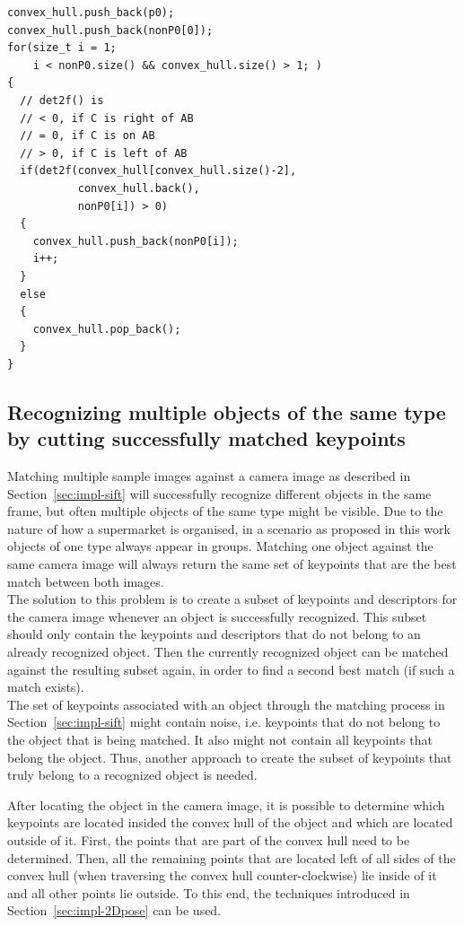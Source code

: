 \begin{lstlisting}[caption=This C++ code example demonstrates how the Graham Scan algorithm determines the convex hull of an already sorted set of points.]
convex_hull.push_back(p0);
convex_hull.push_back(nonP0[0]);
for(size_t i = 1;
    i < nonP0.size() && convex_hull.size() > 1; )
{
  // det2f() is
  // < 0, if C is right of AB
  // = 0, if C is on AB
  // > 0, if C is left of AB
  if(det2f(convex_hull[convex_hull.size()-2],
           convex_hull.back(),
           nonP0[i]) > 0)
  {
    convex_hull.push_back(nonP0[i]);
    i++;
  }
  else
  {
    convex_hull.pop_back();
  }
}
\end{lstlisting}

\subsection{Recognizing multiple objects of the same type by cutting successfully matched keypoints}
\label{sec:impl-multiple}
Matching multiple sample images against a camera image as described in Section~\ref{sec:impl-sift} will successfully recognize different objects in the same frame, but often multiple objects of the same type might be visible. Due to the nature of how a supermarket is organised, in a scenario as proposed in this work objects of one type always appear in groups. Matching one object against the same camera image will always return the same set of keypoints that are the best match between both images. \\

The solution to this problem is to create a subset of keypoints and descriptors for the camera image whenever an object is successfully recognized. This subset should only contain the keypoints and descriptors that do not belong to an already recognized object. Then the currently recognized object can be matched against the resulting subset again, in order to find a second best match (if such a match exists). \\

The set of keypoints associated with an object through the matching process in Section~\ref{sec:impl-sift} might contain noise, i.e. keypoints that do not belong to the object that is being matched. It also might not contain all keypoints that belong the object. Thus, another approach to create the subset of keypoints that truly belong to a recognized object is needed.

After locating the object in the camera image, it is possible to determine which keypoints are located insided the convex hull of the object and which are located outside of it. First, the points that are part of the convex hull need to be determined. Then, all the remaining points that are located left of all sides of the convex hull (when traversing the convex hull counter-clockwise) lie inside of it and all other points lie outside. To this end, the techniques introduced in Section~\ref{sec:impl-2Dpose} can be used.

